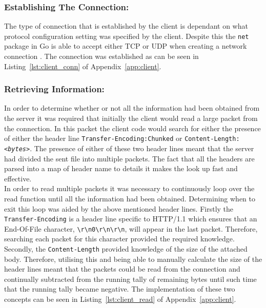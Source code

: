 \documentclass[10pt,twocolumn]{witseiepaper}
\begin{document}
		\subsubsection*{Establishing The Connection:} The type of connection that is established by the client is dependant on what protocol configuration setting was specified by the client. Despite this the \texttt{net} package in Go is able to accept either TCP or UDP when creating a network connection \cite{net}. The connection was established as can be seen in Listing~\ref{lst:client_conn} of Appendix~\ref{app:client}. 
		
		\subsubsection*{Retrieving Information:} In order to determine whether or not all the information had been obtained from the server it was required that initially the client would read a large packet from the connection. In this packet the client code would search for either the presence of either the header line \texttt{Transfer-Encoding:Chunked} or \texttt{Content-Length:\textit{<bytes>}}. The presence of either of these two header lines meant that the server had divided the sent file into multiple packets. The fact that all the headers are parsed into a map of header name to details it makes the look up fast and effective. \\
		
		In order to read multiple packets it was necessary to continuously loop over the read function until all the information had been obtained. Determining when to exit this loop was aided by the above mentioned header lines. Firstly the \texttt{Transfer-Encoding} is a header line specific to HTTP/1.1 which ensures that an End-Of-File character, \texttt{\textbackslash r\textbackslash n0\textbackslash r\textbackslash n\textbackslash r\textbackslash n}, will appear in the last packet. Therefore, searching each packet for this character provided the required knowledge. Secondly, the \texttt{Content-Length} provided knowledge of the size of the attached body. Therefore, utilising this and being able to manually calculate the size of the header lines meant that the packets could be read from the connection and continually subtracted from the running tally of remaining bytes until such time that the running tally became negative. The implementation of these two concepts can be seen in Listing~\ref{lst:client_read} of Appendix~\ref{app:client}. 
		
\end{document}
